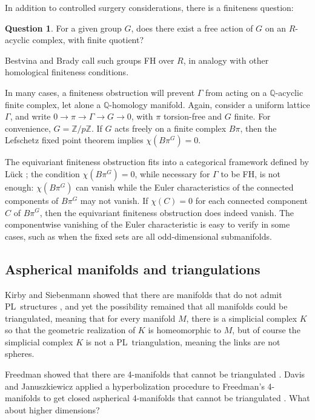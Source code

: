 \documentclass[12pt]{amsart}
\newcommand{\nomr}[1]{\nocite{MR#1}}
\theoremstyle{definition}
\newtheorem{question}[theorem]{Question}
\newcommand{\Q}{\mathbb{Q}}
\newcommand{\Z}{\mathbb{Z}}
\begin{document}
In addition to controlled surgery considerations, there is a finiteness question:
\begin{question}
For a given group $G$, does there exist a free action of $G$
on an $R$-acyclic complex, with finite quotient?
\end{question}
\noindent
Bestvina and Brady \cite{MR1465330} call such groups FH over $R$, in
analogy with other homological finiteness conditions.

In many cases, a finiteness obstruction will prevent $\Gamma$ from
acting on a $\Q$-acyclic finite complex, let alone a $\Q$-homology
manifold.  Again, consider a uniform lattice $\Gamma$, and write $0
\to \pi \to \Gamma \to G \to 0$, with $\pi$ torsion-free and $G$
finite.  For convenience, $G = \Z/p\Z$.  If $G$ acts freely on a
finite complex $B\pi$, then the Lefschetz fixed point theorem implies
$\chi(B\pi^G) = 0$.

The equivariant finiteness obstruction fits into a categorical
framework defined by L\"uck \cite{MR1027600}; the condition
$\chi(B\pi^G) = 0$, while necessary for $\Gamma$ to be FH, is not
enough: $\chi(B\pi^G)$ can vanish while the Euler characteristics of
the connected components of $B\pi^G$ may not vanish.  If $\chi(C) = 0$
for each connected component $C$ of $B\pi^G$, then the equivariant
finiteness obstruction does indeed vanish.  The componentwise
vanishing of the Euler characteristic is easy to verify in some cases,
such as when the fixed sets are all odd-dimensional submanifolds.

\nomr{859767}
\nomr{868892}
\nomr{1076524}
\nomr{1381603}
\nomr{2222492}

\nocite{MR2036915}
\nocite{MR1943285}
\nocite{MR2177038}
\nocite{thesis}

\subsection{Aspherical manifolds and triangulations}
\label{subsection:aspherical-manifold-and-triangulations}

Kirby and Siebenmann showed that there are manifolds that do not admit
PL~structures \cite{MR242166}, and yet the possibility remained that
all manifolds could be triangulated, meaning that for every manifold
$M$, there is a simplicial complex $K$ so that the geometric
realization of $K$ is homeomorphic to $M$, but of course the
simplicial complex $K$ is not a PL~triangulation, meaning the links
are not spheres.

Freedman showed that there are 4-manifolds that cannot be triangulated
\cite{MR679066}.  Davis and Januszkiewicz applied a hyperbolization
procedure to Freedman's 4-manifolds to get closed aspherical
4-manifolds that cannot be triangulated \cite{MR1131435}.  What about
higher dimensions?
\end{document}
